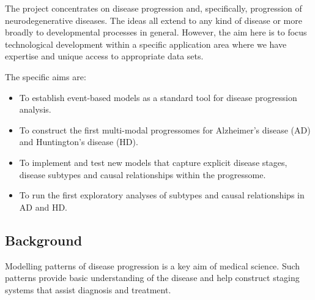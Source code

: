 \documentclass[a4paper,11pt]{article}
\begin{document}
The project concentrates on disease progression and, specifically,
progression of neurodegenerative diseases.  The ideas all extend to
any kind of disease or more broadly to developmental processes in
general.  However, the aim here is to focus technological development
within a specific application area where we have expertise and unique
access to appropriate data sets.

The specific aims are:

\begin{itemize}

  \item To establish event-based models as a standard tool for disease
progression analysis.

  \item To construct the first multi-modal progressomes for
Alzheimer's disease (AD) and Huntington's disease (HD).

  \item To implement and test new models that capture explicit disease
stages, disease subtypes and causal relationships within the
progressome.

  \item To run the first exploratory analyses of subtypes and causal
relationships in AD and HD.

\end{itemize}

\subsection*{Background}

Modelling patterns of disease progression is a key aim of medical
science. Such patterns provide basic understanding of the disease and
help construct staging systems that assist diagnosis and
treatment.
\end{document}
